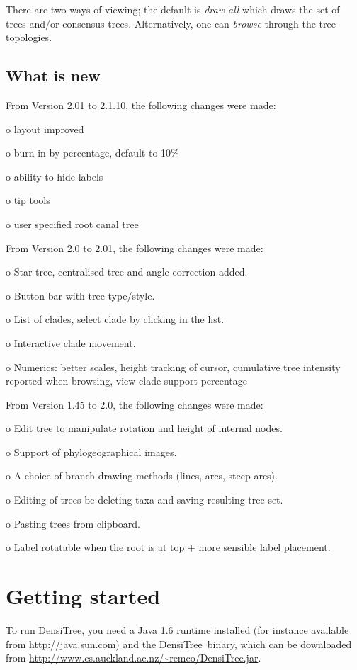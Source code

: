 \documentclass{article}
\def\DensiTree{DensiTree}
\begin{document}
There are two ways of viewing; the default is {\em draw all} which draws the set 
of trees and/or consensus trees. Alternatively, one can {\em browse} through the
tree topologies.

\subsection{What is new \label{ssec.new}}
From Version 2.01 to 2.1.10, the following changes were made:

o layout improved

o burn-in by percentage, default to 10\%

o ability to hide labels

o tip tools

o user specified root canal tree

From Version 2.0 to 2.01, the following changes were made:

o Star tree, centralised tree and angle correction added.

o Button bar with tree type/style.

o List of clades, select clade by clicking in the list.

o Interactive clade movement.

o Numerics: better scales, height tracking of cursor, cumulative tree intensity reported when browsing, view clade support percentage

From Version 1.45 to 2.0, the following changes were made:

o Edit tree to manipulate rotation and height of internal nodes.

o Support of phylogeographical images.

o A choice of branch drawing methods (lines, arcs, steep arcs).

o Editing of trees be deleting taxa and saving resulting tree set.

o Pasting trees from clipboard.

o Label rotatable when the root is at top + more sensible label placement.

\newpage
\section{Getting started\label{sec.start}}

To run \DensiTree, you need a Java 1.6 runtime installed 
(for instance available from \url{http://java.sun.com}) and the \DensiTree\ binary,
which can be downloaded from \url{http://www.cs.auckland.ac.nz/~remco/DensiTree.jar}.
\end{document}
